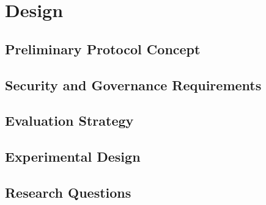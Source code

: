 
%

\chapter{Design}
\label{cha:design}

\glsresetall

\section{Preliminary Protocol Concept}
\label{sec:preliminary_protocol_concept}

\section{Security and Governance Requirements}
\label{sec:security_governance_requirements}

\section{Evaluation Strategy}
\label{sec:evaluation_strategy}

\section{Experimental Design}
\label{sec:experimental_design}

\section{Research Questions}
\label{sec:research_questions}